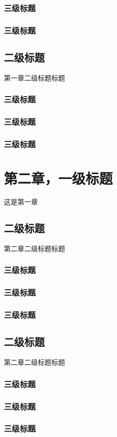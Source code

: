 \documentclass[UTF8,11pt,a4paper]{ctexart}
\begin{document}
	\subsubsection{三级标题}
	\subsubsection{三级标题}
	\subsection{二级标题} 第一章二级标题标题
	\subsubsection{三级标题}
	\subsubsection{三级标题}
	\subsubsection{三级标题}
	\newpage
	
	\section{第二章，一级标题} 这是第一章
	\subsection{二级标题} 第二章二级标题标题
	\subsubsection{三级标题}
	\subsubsection{三级标题}
	\subsubsection{三级标题}
	\subsection{二级标题} 第二章二级标题标题
	\subsubsection{三级标题}
	\subsubsection{三级标题}
	\subsubsection{三级标题}
\end{document}
